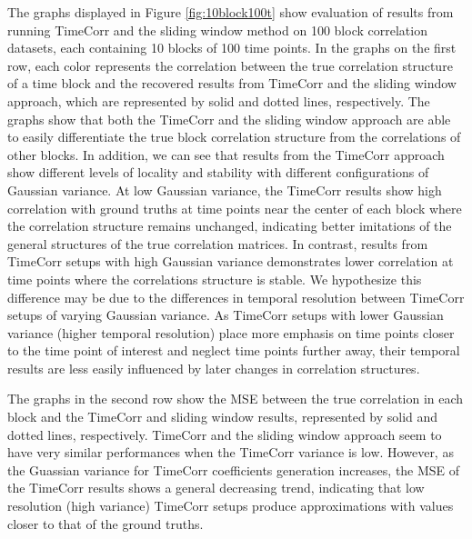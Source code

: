 \documentclass[11pt]{article}
\begin{document}
The graphs displayed in Figure \ref{fig:10block100t} show evaluation of results from running TimeCorr and the sliding window method on 100 block correlation datasets, each containing 10 blocks of 100 time points. In the graphs on the first row, each color represents the correlation between the true correlation structure of a time block and the recovered results from TimeCorr and the sliding window approach, which are represented by solid and dotted lines, respectively. The graphs show that both the TimeCorr and the sliding window approach are able to easily differentiate the true block correlation structure from the correlations of other blocks. In addition, we can see that results from the TimeCorr approach show different levels of locality and stability with different configurations of Gaussian variance. At low Gaussian variance, the TimeCorr results show high correlation with ground truths at time points near the center of each block where the correlation structure remains unchanged, indicating better imitations of the general structures of the true correlation matrices. In contrast, results from TimeCorr setups with high Gaussian variance demonstrates lower correlation at time points where the correlations structure is stable. We hypothesize this difference may be due to the differences in temporal resolution between TimeCorr setups of varying Gaussian variance. As TimeCorr setups with lower Gaussian variance (higher temporal resolution) place more emphasis on time points closer to the time point of interest and neglect time points further away, their temporal results are less easily influenced by later changes in correlation structures.

The graphs in the second row show the MSE between the true correlation in each block and the TimeCorr and sliding window results, represented by solid and dotted lines, respectively. TimeCorr and the sliding window approach seem to have very similar performances when the TimeCorr variance is low. However, as the Guassian variance for TimeCorr coefficients generation increases, the MSE of the TimeCorr results shows a general decreasing trend, indicating that low resolution (high variance) TimeCorr setups produce approximations with values closer to that of the ground truths.
\end{document}
